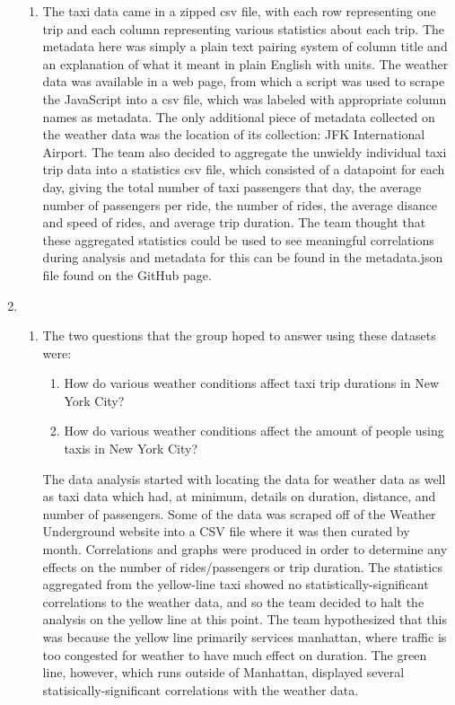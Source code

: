 \documentclass{article}
\begin{document}
\begin{enumerate}
\begin{enumerate}
        \item %
        The taxi data came in a zipped csv file, with each row representing one trip and each column representing various statistics about each trip. The metadata here was simply a plain text pairing system of column title and an explanation of what it meant in plain English with units. The weather data was available in a web page, from which a script was used to scrape the JavaScript into a csv file, which was labeled with appropriate column names as metadata. The only additional piece of metadata collected on the weather data was the location of its collection: JFK International Airport. The team also decided to aggregate the unwieldy individual taxi trip data into a statistics csv file, which consisted of a datapoint for each day, giving the total number of taxi passengers that day, the average number of passengers per ride, the number of rides, the average disance and speed of rides, and average trip duration. The team thought that these aggregated statistics could be used to see meaningful correlations during analysis and metadata for this can be found in the metadata.json file found on the GitHub page.


    \end{enumerate}

    \item %
    \begin{enumerate}

        \item %

        The two questions that the group hoped to answer using these datasets were:

        \begin{enumerate}
            \item
            How do various weather conditions affect taxi trip durations in New York City?

            \item
            How do various weather conditions affect the amount of people using taxis in New York City?

        \end{enumerate}

        The data analysis started with locating the data for weather data as well as taxi data which had, at minimum, details on duration, distance, and number of passengers. Some of the data was scraped off of the Weather Underground website into a CSV file where it was then curated by month. Correlations and graphs were produced in order to determine any effects on the number of rides/passengers or trip duration. The statistics aggregated from the yellow-line taxi showed no statistically-significant correlations to the weather data, and so the team decided to halt the analysis on the yellow line at this point. The team hypothesized that this was because the yellow line primarily services manhattan, where traffic is too congested for weather to have much effect on duration. The green line, however, which runs outside of Manhattan, displayed several statisically-significant correlations with the weather data.



\end{enumerate}
\end{enumerate}
\end{document}
